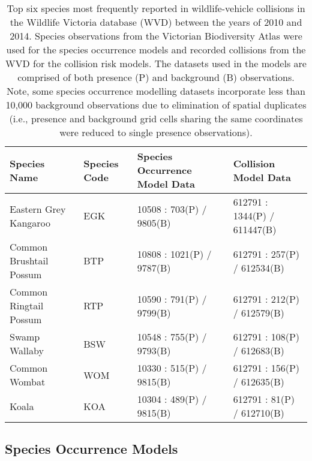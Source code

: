 \begin{table}[!t]
\caption[Six mammal species most frequently reported in wildlife-vehicle collisions]{Top six species most frequently reported in wildlife-vehicle collisions in the Wildlife Victoria database (WVD) between the years of 2010 and 2014. Species observations from the Victorian Biodiversity Atlas were used for the species occurrence models and recorded collisions from the WVD for the collision risk models. The datasets used in the models are comprised of both presence (P) and background (B) observations. Note, some species occurrence modelling datasets incorporate less than 10,000 background observations due to elimination of spatial duplicates (i.e., presence and background grid cells sharing the same coordinates were reduced to single presence observations).}
\centering
\setlength{\extrarowheight}{.5em}
\begin{tabularx}{0.9\textwidth}{Ylll} \toprule
Species Name                     &Species Code     &Species Occurrence Model Data     &Collision Model Data \\ \midrule 
Eastern Grey Kangaroo 	& EGK	& 10508 : 703(P) / 9805(B) 	& 612791 : 1344(P) / 611447(B) \\ 
Common Brushtail Possum & BTP	& 10808 : 1021(P) / 9787(B)	& 612791 : 257(P) / 612534(B) \\ 
Common Ringtail Possum 	& RTP	& 10590 : 791(P) / 9799(B)	& 612791 : 212(P) / 612579(B) \\ 
Swamp Wallaby		 	& BSW	& 10548 : 755(P) / 9793(B) 	& 612791 : 108(P) / 612683(B) \\ 
Common Wombat 			& WOM	& 10330 : 515(P) / 9815(B) 	& 612791 : 156(P) / 612635(B) \\ 
Koala 					& KOA 	& 10304 : 489(P) / 9815(B) 	& 612791 : 81(P) / 612710(B) \\ 
\bottomrule
\end{tabularx}
\label{6sp_species_data}
\end{table}

\subsection{Species Occurrence Models}

